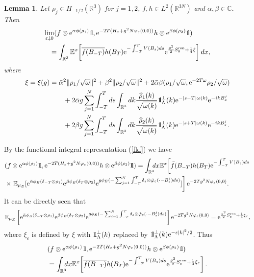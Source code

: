 \documentclass[11pt]{article}
\newtheorem{lemma}[theorem]{Lemma}
\newcommand{\bl}[1]{\begin{lemma}\label{#1}}
\newcommand{\el}{\end{lemma}}
\def\bbbone{{\mathchoice {\rm 1\mskip-4mu l} {\rm 1\mskip-4mu l}
{\rm 1\mskip-4.5mu l} {\rm 1\mskip-5mu l}}}
\def\one{\bbbone}
\newcommand{\kp}{\one_\Lambda^\perp(k)}
\providecommand{\idx}{\int_{\BR} \!\!\! dx}
\newcommand{\Ebb}{{\mathbb E}}
\providecommand{\BR}{{\mathbb{R}^3 }}
\providecommand{\BRN}{{\mathbb{R}^{3N} }}
\providecommand{\CC}{{\mathbb{C}}}
\providecommand{\kak}[1]{(\ref{#1})}
\providecommand{\LRN}{{L^2(\BRN)}}
\providecommand{\hn}{H}%
\providecommand{\ov}[1]{\overline{#1}}
\providecommand{\han}{{1/2}}
\providecommand{\non}{\nonumber}
\providecommand{\e}{{\rm e}}
\providecommand{\1}{\mathbb{1}}
\providecommand{\eps}{\varepsilon}
\providecommand{\ren}{{\rm ren}}
\begin{document}
\bl{h123}
Let $ \rho_j\in H_{-\han}(\BR)$ for $j=1,2$, $f,h\in\LRN$ and $\alpha,\beta\in\CC$. Then
\begin{eqnarray}
\lefteqn{
\lim_{\eps\downarrow0} (f\otimes \e^{\alpha\phi(\rho_1)}\one,
\e^{-2T(\hn_\eps+g^2N\varphi_\eps(0,0))} h\otimes  \e^{\beta\phi(\rho_2)}\one) } \non\\
&&\label{main22}
= \int_{\BR} \Ebb^x\!\left[\ov{f(B_{-T})} h(B_T)\e^{-\int_{-T}^T V(B_s) ds} \e^{\frac{g^2}{2}
S_0^\ren +\frac{1}{4}\xi} \right]dx,
\end{eqnarray}
where
\begin{align*}
\xi=\xi(g)
&=
\bar \alpha^2\|\rho_1/\sqrt\omega \|^2+\beta^2\|\rho_2/\sqrt\omega\|^2+2\bar
\alpha \beta (\rho_1/\sqrt\omega, \e^{-2T\omega} \rho_2/\sqrt\omega) \\
&
\qquad + 2\bar \alpha g \sum_{j=1}^N
\int_{-T}^Tds \int_\BR dk \frac{\widehat \rho_1(k)}{\sqrt{\omega(k)}}\kp
\e^{-|s-T|\omega(k)}\e^{-ikB_s^j} \\
&
\qquad
+ 2\beta  g
\sum_{j=1}^N
\int_{-T}^Tds \int_\BR dk \frac{\widehat \rho_2(k)}{\sqrt{\omega(k)}}\kp
\e^{-|s+T|\omega(k)}\e^{-ikB_s^j}.
\end{align*}
\el
\proof
By the functional integral representation \kak{fkf} we have
\begin{align*}
&
(f\otimes \e^{\alpha\phi(\rho_1)}\one,
\e^{-2T(\hn_\eps+g^2N \varphi_\eps(0,0))} h\otimes
\e^{\beta\phi(\rho_2)}\one)
=
\idx \Ebb^x\!\left[\bar f(B_{-T} )h(B_T) \e^{-\int_{-T}^TV(B_s) ds}\right.\\
&\times
\left.
\Ebb_{\mu_E}[\e^{\bar \alpha\phi_E(\delta_{-T}\otimes \rho_1)}
\e^{\beta \phi_E(\delta_{T}\otimes \rho_2)} \e^{g \phi_E(-\sum_{j=1}^N
\int_{-T}^ T \delta_s\otimes  \tilde \varphi_\eps (\cdot-B_s^j)ds)} ]\right]
\e^{-2Tg^2 N\varphi_\eps(0,0)}.
\end{align*}
It can be
directly seen that
$$
\Ebb_{\mu_E}\left[\e^{\bar \alpha\phi_E(\delta_{-T}\otimes \rho_1)}
\e^{\beta \phi_E(\delta_{T}\otimes \rho_2)}\e^{g \phi_E(-\sum_{j=1}^N
\int_{-T}^ T \delta_s\otimes  \tilde \varphi_\eps (\cdot-B_s^j)ds)} \right]
\e^{-2Tg^2 N\varphi_\eps(0,0)} =\e^{\frac{g^2}{2}S_\eps^\ren +\frac{1}{4}\xi_\eps},
$$
where $\xi_\eps$ is defined by $\xi$ with $\kp$ replaced by $\kp \e^{-\eps|k|^2/2}$. Thus
\begin{align*}
& (f\otimes \e^{\alpha\phi(\rho_1)}\one, \e^{-2T(\hn_\eps+g^2N\varphi_\eps(0,0))}
h\otimes  \e^{\beta\phi(\rho_2)}\one) \\
&
= \int_{\BR} \!\!\! dx \Ebb^x\!\left[\ov{f(B_{-T})} h(B_T)\e^{-\int_{-T}^T V(B_s) ds} \e^{\frac{g^2}{2}
S_\eps^\ren +\frac{1}{4}\xi_\eps} \right].
\end{align*}
\end{document}
